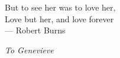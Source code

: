 

\begin{dedication}
\begin{flushright}
    \textcolor[rgb]{0.71,0.71,0.71}{But to see her was to love her,\\
    Love but her, and love forever \\ \medskip
    --- Robert Burns}
\end{flushright}


\medskip



\begin{center}
    {\Large\emph{To Genevieve}}
\end{center}

\medskip
\end{dedication} 
